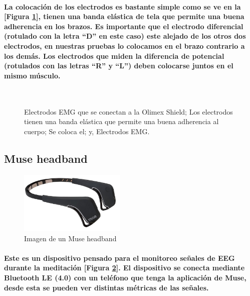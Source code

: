 \documentclass{article}
\begin{document}
\paragraph{
La colocación de los electrodos es bastante simple como se ve en la [Figura \ref{fig:colocacion-de-electrodos}], tienen una banda elástica de tela que permite una buena adherencia en los brazos. Es importante que el electrodo diferencial (rotulado con la letra ``D'' en este caso) este alejado de los otros dos electrodos, en nuestras pruebas lo colocamos en el brazo contrario a los demás. Los electrodos que miden la diferencia de potencial (rotulados con las letras ``R'' y ``L'') deben colocarse juntos en el mismo músculo.
}

\begin{figure}[ht]%
\centering
{}%
\hspace{8pt}%
 \\
%
\hspace{8pt}%
%
\caption[]{
 Electrodos EMG que se conectan a la Olimex Shield;
 Los electrodos tienen una banda elástica que permite una buena adherencia al cuerpo;
 Se coloca el; y,
 Electrodos EMG.}%
\label{fig:colocacion-de-electrodos}%
\end{figure}

\subsection{Muse headband}
\begin{figure}[ht]
    \centering
    \includegraphics[width=2in]{museheadband.jpg}%
    \caption{Imagen de un Muse headband}
    \label{fig:muse}
\end{figure}
\paragraph{
Este es un dispositivo pensado para el monitoreo señales de EEG durante la meditación [Figura \ref{fig:muse}]. El dispositivo se conecta mediante Bluetooth LE (4.0) con un teléfono que tenga la aplicación de Muse, desde esta se pueden ver distintas métricas de las señales.
}
\end{document}
